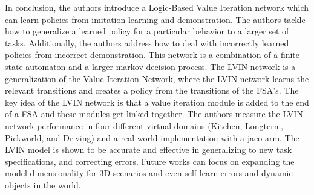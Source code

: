 \documentclass[letterpaper, 10 pt, conference]{ieeeconf}  %
\begin{document}
In conclusion, the authors introduce a Logic-Based Value Iteration network which can learn policies from imitation learning and demonstration. The authors tackle how to generalize a learned policy for a particular behavior to a larger set of tasks. Additionally, the authors address how to deal with incorrectly learned policies from incorrect demonstration. This network is a combination of a finite state automaton and a larger markov decision process. The LVIN network is a generalization of the Value Iteration Network, where the LVIN network learns the relevant transitions and creates a policy from the transitions of the FSA's. The key idea of the LVIN network is that a value iteration module is added to the end of a FSA and these modules get linked together. 
\newline
\indent The authors measure the LVIN network performance in four different virtual domains (Kitchen, Longterm, Pickworld, and Driving) and a real world implementation with a jaco arm. The LVIN model is shown to be accurate and effective in generalizing to new task specifications, and correcting errors. Future works can focus on expanding the model dimensionality for 3D scenarios and even self learn errors and dynamic objects in the world.

\addtolength{\textheight}{-12cm}   %







\end{document}
